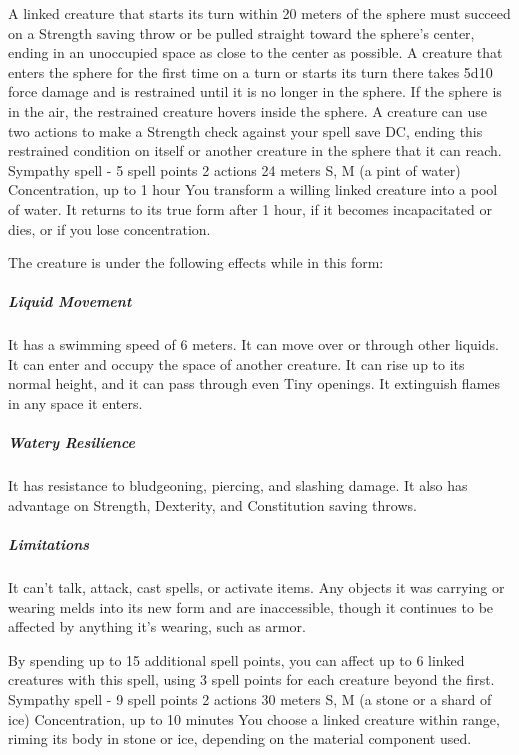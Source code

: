         A linked creature that starts its turn within 20 meters of the sphere must succeed on a Strength saving throw or be pulled straight toward the sphere's center, ending in an unoccupied space as close to the center as possible.
        A creature that enters the sphere for the first time on a turn or starts its turn there takes 5d10 force damage and is restrained until it is no longer in the sphere.
        If the sphere is in the air, the restrained creature hovers inside the sphere.
        A creature can use two actions to make a Strength check against your spell save DC, ending this restrained condition on itself or another creature in the sphere that it can reach.
        {Sympathy spell - 5 spell points}
        {2 actions}
        {24 meters}
        {S, M (a pint of water)}
        {Concentration, up to 1 hour}
        You transform a willing linked creature into a pool of water.
        It returns to its true form after 1 hour, if it becomes incapacitated or dies, or if you lose concentration.

        The creature is under the following effects while in this form:
        \subparagraph{Liquid Movement}
        It has a swimming speed of 6 meters.
        It can move over or through other liquids.
        It can enter and occupy the space of another creature.
        It can rise up to its normal height, and it can pass through even Tiny openings.
        It extinguish flames in any space it enters.

        \subparagraph{Watery Resilience}
        It has resistance to bludgeoning, piercing, and slashing damage.
        It also has advantage on Strength, Dexterity, and Constitution saving throws.

        \subparagraph{Limitations}
        It can't talk, attack, cast spells, or activate items.
        Any objects it was carrying or wearing melds into its new form and are inaccessible, though it continues to be affected by anything it's wearing, such as armor.

        By spending up to 15 additional spell points, you can affect up to 6 linked creatures with this spell, using 3 spell points for each creature beyond the first.
        {Sympathy spell - 9 spell points}
        {2 actions}
        {30 meters}
        {S, M (a stone or a shard of ice)}
        {Concentration, up to 10 minutes}
        You choose a linked creature within range, riming its body in stone or ice, depending on the material component used.

